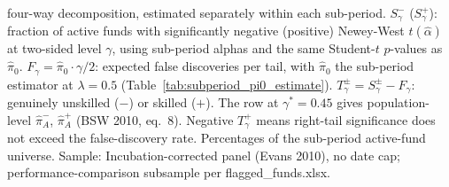 \begin{table}[!htbp]
\begin{minipage}{\tabletempwidth}
\ifdim\wd\tabletempbox>\linewidth
  \resizebox{\linewidth}{!}{\usebox{\tabletempbox}}
\else
  \usebox{\tabletempbox}
\fi
\par\medskip
\begin{singlespace}\footnotesize\noindent
\textcite{BarrasScailletWermers2010} four-way decomposition, estimated separately within each sub-period. $S^-_\gamma$ ($S^+_\gamma$): fraction of active funds with significantly negative (positive) Newey-West $t(\hat{\alpha})$ at two-sided level $\gamma$, using sub-period \textcite{Carhart1997} alphas and the same Student-$t$ $p$-values as $\hat{\pi}_0$. $F_\gamma = \hat{\pi}_0 \cdot \gamma/2$: expected false discoveries per tail, with $\hat{\pi}_0$ the sub-period \textcite{Storey2002} estimator at $\lambda = 0.5$ (Table~\ref{tab:subperiod_pi0_estimate}). $T^\pm_\gamma = S^\pm_\gamma - F_\gamma$: genuinely unskilled ($-$) or skilled ($+$). The row at $\gamma^* = 0.45$ gives population-level $\hat{\pi}^-_A$, $\hat{\pi}^+_A$ (BSW 2010, eq.~8). Negative $T^+_\gamma$ means right-tail significance does not exceed the false-discovery rate. Percentages of the sub-period active-fund universe. Sample: Incubation-corrected panel (Evans 2010), no date cap; performance-comparison subsample per flagged\_funds.xlsx.
\end{singlespace}
\end{minipage}
\end{table}

